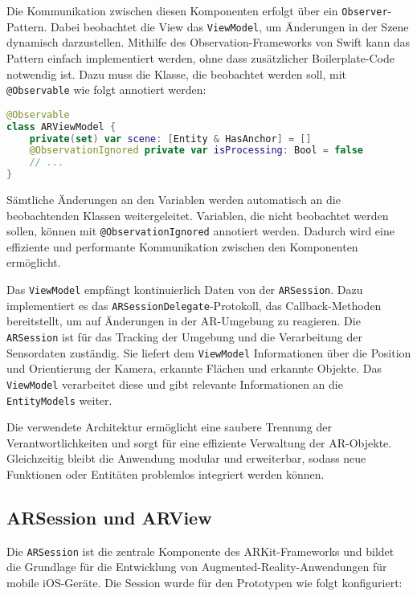 Die Kommunikation zwischen diesen Komponenten erfolgt über ein \texttt{Observer}-Pattern. Dabei beobachtet die View das \texttt{ViewModel}, um Änderungen in der Szene dynamisch darzustellen. Mithilfe des Observation-Frameworks von Swift kann das Pattern einfach implementiert werden, ohne dass zusätzlicher Boilerplate-Code notwendig ist. Dazu muss die Klasse, die beobachtet werden soll, mit \texttt{@Observable} wie folgt annotiert werden:

\begin{lstlisting}[language=Swift]
@Observable
class ARViewModel {
    private(set) var scene: [Entity & HasAnchor] = []
    @ObservationIgnored private var isProcessing: Bool = false
    // ...
}
\end{lstlisting}

Sämtliche Änderungen an den Variablen werden automatisch an die beobachtenden Klassen weitergeleitet. Variablen, die nicht beobachtet werden sollen, können mit \texttt{@ObservationIgnored} annotiert werden. Dadurch wird eine effiziente und performante Kommunikation zwischen den Komponenten ermöglicht.

Das \texttt{ViewModel} empfängt kontinuierlich Daten von der \texttt{ARSession}. Dazu implementiert es das \texttt{ARSessionDelegate}-Protokoll, das Callback-Methoden bereitstellt, um auf Änderungen in der AR-Umgebung zu reagieren. Die \texttt{ARSession} ist für das Tracking der Umgebung und die Verarbeitung der Sensordaten zuständig. Sie liefert dem \texttt{ViewModel} Informationen über die Position und Orientierung der Kamera, erkannte Flächen und erkannte Objekte. Das \texttt{ViewModel} verarbeitet diese und gibt relevante Informationen an die \texttt{EntityModels} weiter. 

Die verwendete Architektur ermöglicht eine saubere Trennung der Verantwortlichkeiten und sorgt für eine effiziente Verwaltung der AR-Objekte. Gleichzeitig bleibt die Anwendung modular und erweiterbar, sodass neue Funktionen oder Entitäten problemlos integriert werden können.

\subsection{ARSession und ARView}

Die \texttt{ARSession} ist die zentrale Komponente des ARKit-Frameworks und bildet die Grundlage für die Entwicklung von Augmented-Reality-Anwendungen für mobile iOS-Geräte. Die Session wurde für den Prototypen wie folgt konfiguriert:


